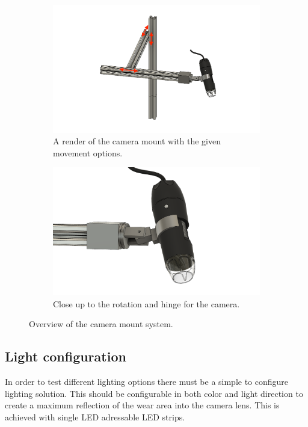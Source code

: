 		\begin{figure}[hbtp]
		\centering
		\begin{subfigure}{0.49\textwidth}
			\includegraphics[width=\linewidth]{fig/Camera_setup/camera_mount/second_camera_mount/camera mount v9 back top.png}
			\caption{A render of the camera mount with the given movement options.}
			\label{fig:impl:cs:cameramount:full}
		\end{subfigure}
		\hspace*{\fill}
		\begin{subfigure}{0.49\textwidth}
			\includegraphics[width=\linewidth]{fig/Camera_setup/camera_mount/second_camera_mount/camera mount v9 zoom camera.png}
			\caption{Close up to the rotation and hinge for the camera.}
			\label{fig:impl:cs:cameramount:zoom}
		\end{subfigure}
		\caption{Overview of the camera mount system.}
		\end{figure}
		
		
	\subsection{Light configuration}
	In order to test different lighting options there must be a simple to configure lighting solution. This should be configurable in both color and light direction to create a maximum reflection of the wear area into the camera lens. This is achieved with single LED adressable LED strips.
	
